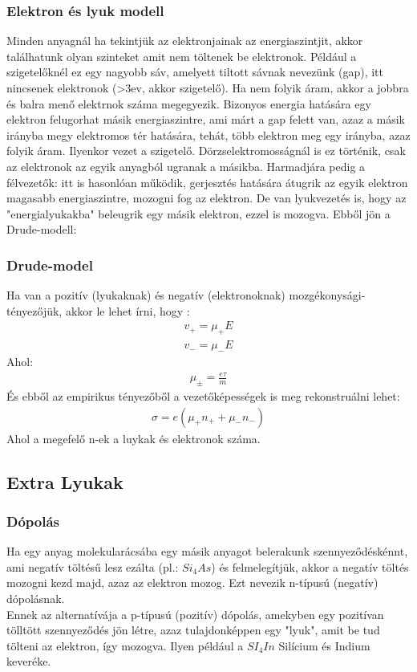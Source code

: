 \documentclass{article}
\begin{document}
\subsubsection{Elektron és lyuk modell}
Minden anyagnál ha tekintjük az elektronjainak az energiaszintjit, akkor találhatunk olyan szinteket amit nem töltenek be elektronok. Például a szigetelőknél ez egy nagyobb sáv, amelyett tiltott sávnak nevezünk (gap), itt nincsenek elektronok (>3ev, akkor szigetelő). Ha nem folyik áram, akkor a jobbra és balra menő elektrnok száma megegyezik. Bizonyos energia hatására egy elektron felugorhat másik energiaszintre, ami márt a gap felett van, azaz a másik irányba megy elektromos tér hatására, tehát, több elektron meg egy irányba, azaz folyik áram. Ilyenkor vezet a szigetelő. Dörzselektromosságnál is ez történik, csak az elektronok az egyik anyagból ugranak a másikba. Harmadjára pedig a félvezetők: itt is hasonlóan működik, gerjesztés hatására átugrik az egyik elektron magasabb energiaszintre, mozogni fog az elektron. De van lyukvezetés is, hogy az "energialyukakba" beleugrik egy másik elektron, ezzel is mozogva. Ebből jön a Drude-modell:
\subsubsection{Drude-model}
Ha van a pozitív (lyukaknak) és negatív (elektronoknak) mozgékonysági-tényezőjük, akkor le lehet írni, hogy :
\begin{gather*}
v_{+}=\mu_{+} E \\
v_{-} = \mu_{-} E
\end{gather*}
Ahol:
\begin{gather*}
\mu_{\pm} = \frac{e\tau}{m}
\end{gather*}
És ebből az empirikus tényezőből a vezetőképességek is meg rekonstruálni lehet:
\begin{gather*}
 \sigma = e(\mu_{+} n_{+} + \mu_{-} n_{-})
\end{gather*}
Ahol a megefelő n-ek a luykak és elektronok száma.
\subsection{Extra Lyukak}
\subsubsection{Dópolás}
Ha egy anyag molekularácsába egy másik anyagot belerakunk szennyeződéskénnt, ami negatív töltésű lesz ezálta (pl.: $ Si_{4}As $) és felmelegítjük, akkor a negatív töltés mozogni kezd majd, azaz az elektron mozog. Ezt nevezik n-típusú (negatív) dópolásnak. \\
Ennek az alternatívája a p-típusú (pozitív) dópolás, amekyben egy pozitívan tölltött szennyeződés jön létre, azaz tulajdonképpen egy "lyuk", amit be tud tölteni az elektron, így mozogva. Ilyen például a $SI_{4}In$ Silícium és Indium keveréke.
\end{document}
